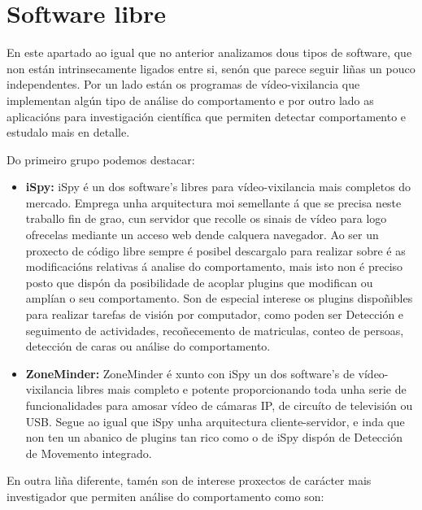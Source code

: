     \section{Software libre}

        En este apartado ao igual que no anterior analizamos dous tipos de software, que non están
        intrinsecamente ligados entre si, senón que parece seguir liñas un pouco independentes. Por
        un lado están os programas de vídeo-vixilancia que implementan algún tipo de análise do
        comportamento e por outro lado as aplicacións para investigación científica que permiten 
        detectar comportamento e estudalo mais en detalle.
        
        Do primeiro grupo podemos destacar:
        \begin{itemize}
         \item \textbf{iSpy:}\cite{iSpy-webpage}
            iSpy é un dos software's libres para vídeo-vixilancia mais completos do mercado. Emprega
            unha arquitectura moi semellante á que se precisa neste traballo fin de grao, cun 
            servidor que recolle os sinais de vídeo para logo ofrecelas mediante un acceso web 
            dende calquera navegador. 
            Ao ser un proxecto de código libre sempre é posibel descargalo para realizar sobre é as
            modificacións relativas á analise do comportamento, mais isto non é preciso posto que 
            dispón da posibilidade de acoplar plugins que modifican ou amplían o seu comportamento.
            Son de especial interese os plugins dispoñibles para realizar tarefas de visión por
            computador\cite{iSpy-plugins}, como poden ser Detección e seguimento de actividades,
            recoñecemento de matriculas, conteo de persoas, detección de caras ou análise do 
            comportamento.
         \item \textbf{ZoneMinder:} \cite{zoneMinder-webPage}
            ZoneMinder é xunto con iSpy un dos software's de vídeo-vixilancia libres mais completo
            e potente proporcionando toda unha serie de funcionalidades para amosar vídeo de cámaras
            IP, de circuíto de televisión ou USB. Segue ao igual que iSpy unha arquitectura 
            cliente-servidor, e inda que non ten un abanico de plugins tan rico como o de iSpy 
            dispón de Detección de Movemento integrado\cite{zoneMinder-motion-detection}.
        \end{itemize}
        
        En outra liña diferente, tamén son de interese proxectos de carácter mais investigador que 
        permiten análise do comportamento como son:
        
